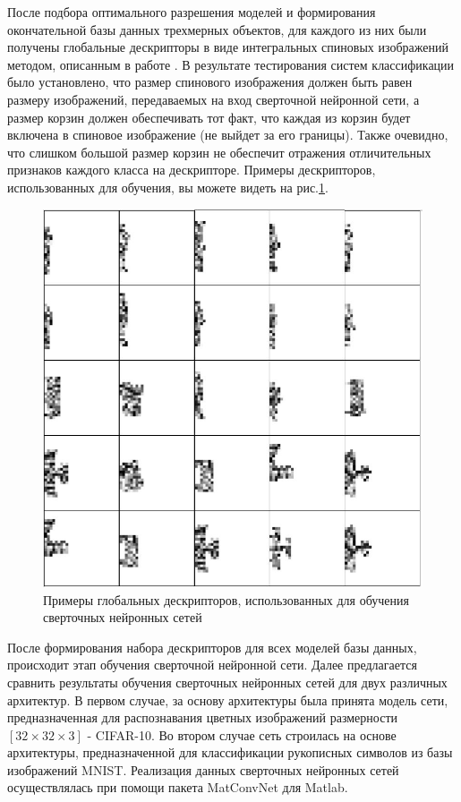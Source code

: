 \documentclass[14pt]{article}
\numberwithin{figure}{section}
\numberwithin{equation}{section}
\begin{document}
 После подбора оптимального разрешения моделей и формирования окончательной базы данных трехмерных объектов, для каждого из них были получены глобальные дескрипторы в виде интегральных спиновых изображений методом, описанным в работе \cite{Chernikoff}. В результате тестирования систем классификации было установлено, что размер спинового изображения должен быть равен размеру изображений, передаваемых на вход сверточной нейронной сети, а размер корзин должен обеспечивать тот факт, что каждая из корзин будет включена в спиновое изображение (не выйдет за его границы). Также очевидно, что слишком большой размер корзин не обеспечит отражения отличительных признаков каждого класса на дескрипторе. Примеры дескрипторов, использованных для обучения, вы можете видеть на рис.\ref{ris:8}.

 \begin{figure}[h]
 	\begin{center}
 		\includegraphics[scale=0.75] {8.JPG}
 		\caption{Примеры глобальных дескрипторов, использованных для обучения сверточных нейронных сетей}
 		\label{ris:8}
 	\end{center}
 \end{figure}

После формирования набора дескрипторов для всех моделей базы данных, происходит этап обучения сверточной нейронной сети. Далее предлагается сравнить результаты обучения сверточных нейронных сетей для двух различных архитектур. В первом случае, за основу архитектуры была принята модель сети, предназначенная для распознавания цветных изображений размерности $[32 \times 32 \times 3]$ - CIFAR-10. Во втором случае сеть строилась на основе архитектуры, предназначенной для классификации рукописных символов из базы изображений MNIST. Реализация данных сверточных нейронных сетей осуществлялась при помощи пакета MatConvNet для Matlab.
\end{document}

